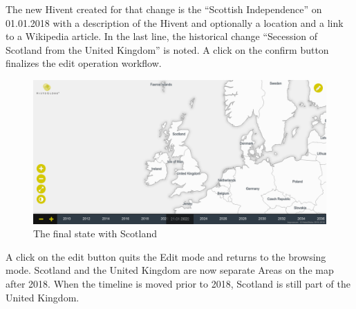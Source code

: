 \begin{landscape}
\begin{minipage}[t]{10cm}
    The new Hivent created for that change is the ``Scottish Independence'' on 01.01.2018 with a description of the Hivent and optionally a location and a link to a Wikipedia article. In the last line, the historical change ``Secession of Scotland from the United Kingdom'' is noted. A click on the confirm button finalizes the edit operation workflow.

  \end{minipage}    %
  \hspace{1.5em}    %
  \begin{minipage}[t]{10cm}

    \begin{figure}[H]
      \centering
      \includegraphics[width=1.0\textwidth]{graphics/development/user_interface_design_process/8_final_state.png}
      \caption{The final state with Scotland}
      \label{fig:final_8_final_state}
    \end{figure}

    A click on the edit button quits the Edit mode and returns to the browsing mode. Scotland and the United Kingdom are now separate Areas on the map after 2018. When the timeline is moved prior to 2018, Scotland is still part of the United Kingdom.

  \end{minipage}

\end{landscape}

\newpage

